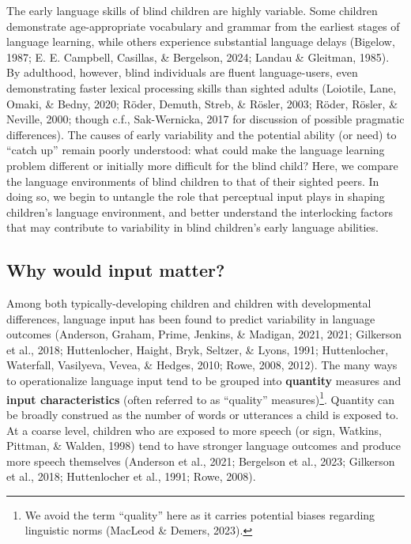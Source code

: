 \documentclass[
  man,floatsintext]{apa6}
\begin{document}
The early language skills of blind children are highly variable. Some children demonstrate age-appropriate vocabulary and grammar from the earliest stages of language learning, while others experience substantial language delays (Bigelow, 1987; E. E. Campbell, Casillas, \& Bergelson, 2024; Landau \& Gleitman, 1985). By adulthood, however, blind individuals are fluent language-users, even demonstrating faster lexical processing skills than sighted adults (Loiotile, Lane, Omaki, \& Bedny, 2020; Röder, Demuth, Streb, \& Rösler, 2003; Röder, Rösler, \& Neville, 2000; though c.f., Sak-Wernicka, 2017 for discussion of possible pragmatic differences). The causes of early variability and the potential ability (or need) to ``catch up'' remain poorly understood: what could make the language learning problem different or initially more difficult for the blind child? Here, we compare the language environments of blind children to that of their sighted peers. In doing so, we begin to untangle the role that perceptual input plays in shaping children's language environment, and better understand the interlocking factors that may contribute to variability in blind children's early language abilities.

\hypertarget{why-would-input-matter}{%
\subsection{Why would input matter?}\label{why-would-input-matter}}

Among both typically-developing children and children with developmental differences, language input has been found to predict variability in language outcomes (Anderson, Graham, Prime, Jenkins, \& Madigan, 2021, 2021; Gilkerson et al., 2018; Huttenlocher, Haight, Bryk, Seltzer, \& Lyons, 1991; Huttenlocher, Waterfall, Vasilyeva, Vevea, \& Hedges, 2010; Rowe, 2008, 2012). The many ways to operationalize language input tend to be grouped into \textbf{quantity} measures and \textbf{input characteristics} (often referred to as ``quality'' measures)\footnote{We avoid the term ``quality'' here as it carries potential biases regarding linguistic norms (MacLeod \& Demers, 2023).}. Quantity can be broadly construed as the number of words or utterances a child is exposed to. At a coarse level, children who are exposed to more speech (or sign, Watkins, Pittman, \& Walden, 1998) tend to have stronger language outcomes and produce more speech themselves (Anderson et al., 2021; Bergelson et al., 2023; Gilkerson et al., 2018; Huttenlocher et al., 1991; Rowe, 2008).
\end{document}
